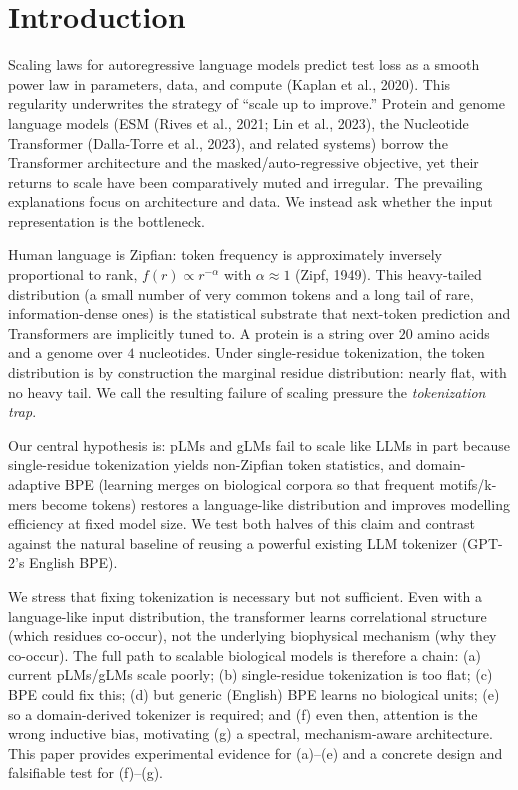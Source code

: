 \documentclass[11pt]{article}
\begin{document}
\section{Introduction}
Scaling laws for autoregressive language models predict test loss as a smooth
power law in parameters, data, and compute (Kaplan et al., 2020). This
regularity underwrites the strategy of ``scale up to improve.'' Protein and
genome language models (ESM (Rives et al., 2021; Lin et al., 2023), the
Nucleotide Transformer (Dalla-Torre et al., 2023), and related systems) borrow
the Transformer architecture and the masked/auto-regressive objective, yet
their returns to scale have been comparatively muted and irregular. The
prevailing explanations focus on architecture and data. We instead ask whether
the input representation is the bottleneck.

Human language is Zipfian: token frequency is approximately inversely
proportional to rank, $f(r) \propto r^{-\alpha}$ with $\alpha \approx 1$ (Zipf,
1949). This heavy-tailed distribution (a small number of very common tokens and
a long tail of rare, information-dense ones) is the statistical substrate that
next-token prediction and Transformers are implicitly tuned to. A protein is a
string over $20$ amino acids and a genome over $4$ nucleotides. Under
single-residue tokenization, the token distribution is by construction the
marginal residue distribution: nearly flat, with no heavy tail. We call the
resulting failure of scaling pressure the \emph{tokenization trap}.

Our central hypothesis is: pLMs and gLMs fail to scale like LLMs in part because
single-residue tokenization yields non-Zipfian token statistics, and
domain-adaptive BPE (learning merges on biological corpora so that frequent
motifs/k-mers become tokens) restores a language-like distribution and improves
modelling efficiency at fixed model size. We test both halves of this claim and
contrast against the natural baseline of reusing a powerful existing LLM
tokenizer (GPT-2's English BPE).

We stress that fixing tokenization is necessary but not sufficient. Even with a
language-like input distribution, the transformer learns correlational structure
(which residues co-occur), not the underlying biophysical mechanism (why they
co-occur). The full path to scalable biological models is therefore a chain:
(a) current pLMs/gLMs scale poorly; (b) single-residue tokenization is too flat;
(c) BPE could fix this; (d) but generic (English) BPE learns no biological
units; (e) so a domain-derived tokenizer is required; and (f) even then,
attention is the wrong inductive bias, motivating (g) a spectral,
mechanism-aware architecture. This paper provides experimental evidence for
(a)--(e) and a concrete design and falsifiable test for (f)--(g).
\end{document}
